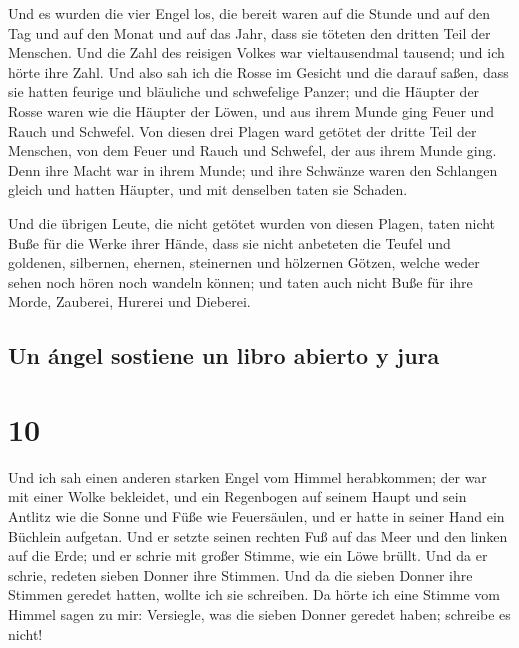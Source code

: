  Und es wurden die vier Engel los, die bereit waren auf
die Stunde und auf den Tag und auf den Monat und auf das Jahr, dass sie
töteten den dritten Teil der Menschen.  Und die Zahl des
reisigen Volkes war vieltausendmal tausend; und ich hörte ihre Zahl.
 Und also sah ich die Rosse im Gesicht und die darauf
saßen, dass sie hatten feurige und bläuliche und schwefelige Panzer; und
die Häupter der Rosse waren wie die Häupter der Löwen, und aus ihrem
Munde ging Feuer und Rauch und Schwefel.  Von diesen drei
Plagen ward getötet der dritte Teil der Menschen, von dem Feuer und
Rauch und Schwefel, der aus ihrem Munde ging.  Denn ihre
Macht war in ihrem Munde; und ihre Schwänze waren den Schlangen gleich
und hatten Häupter, und mit denselben taten sie Schaden.

 Und die übrigen Leute, die nicht getötet wurden von
diesen Plagen, taten nicht Buße für die Werke ihrer Hände, dass sie
nicht anbeteten die Teufel und goldenen, silbernen, ehernen, steinernen
und hölzernen Götzen, welche weder sehen noch hören noch wandeln können;
 und taten auch nicht Buße für ihre Morde, Zauberei,
Hurerei und Dieberei.

\hypertarget{un-uxe1ngel-sostiene-un-libro-abierto-y-jura}{%
\subsection{Un ángel sostiene un libro abierto y
jura}\label{un-uxe1ngel-sostiene-un-libro-abierto-y-jura}}

\hypertarget{section-9}{%
\section{10}\label{section-9}}

 Und ich sah einen anderen starken Engel vom Himmel
herabkommen; der war mit einer Wolke bekleidet, und ein Regenbogen auf
seinem Haupt und sein Antlitz wie die Sonne und Füße wie Feuersäulen,
 und er hatte in seiner Hand ein Büchlein aufgetan. Und er
setzte seinen rechten Fuß auf das Meer und den linken auf die Erde;
 und er schrie mit großer Stimme, wie ein Löwe brüllt. Und
da er schrie, redeten sieben Donner ihre Stimmen.  Und da
die sieben Donner ihre Stimmen geredet hatten, wollte ich sie schreiben.
Da hörte ich eine Stimme vom Himmel sagen zu mir: Versiegle, was die
sieben Donner geredet haben; schreibe es nicht!

